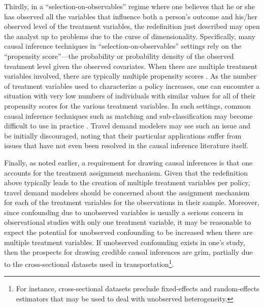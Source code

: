 Thirdly, in a ``selection-on-observables'' regime where one believes that he or she has observed all the variables that influence both a person's outcome and his/her observed level of the treatment variables, the redefinition just described may open the analyst up to problems due to the curse of dimensionality. Specifically, many causal inference techniques in ``selection-on-observables'' settings rely on the ``propensity score''---the probability or probability density of the observed treatment level given the observed covariates. When there are multiple treatment variables involved, there are typically multiple propensity scores \citep{imai2004causal}. As the number of treatment variables used to characterize a policy increases, one can encounter a situation with very low numbers of individuals with similar values for all of their propensity scores for the various treatment variables. In such settings, common causal inference techniques such as matching and sub-classification may become difficult to use in practice \citep{imai2004causal}. Travel demand modelers may see such an issue and be initially discouraged, noting that their particular applications suffer from issues that have not even been resolved in the causal inference literature itself.

Finally, as noted earlier, a requirement for drawing causal inferences is that one accounts for the treatment assignment mechanism. Given that the redefinition above typically leads to the creation of multiple treatment variables per policy, travel demand modelers should be concerned about the assignment mechanism for each of the treatment variables for the observations in their sample. Moreover, since confounding due to unobserved variables is usually a serious concern in observational studies with only one treatment variable, it may be reasonable to expect the potential for unobserved confounding to be increased when there are multiple treatment variables. If unobserved confounding exists in one's study, then the prospects for drawing credible causal inferences are grim, partially due to the cross-sectional datasets used in transportation\footnote{For instance, cross-sectional datasets preclude fixed-effects and random-effects estimators that may be used to deal with unobserved heterogeneity.}. 

